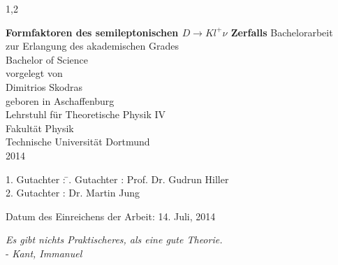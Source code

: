 \documentclass[11pt,a4paper,twoside]{report}
\begin{document}
\begin{spacing}{1,2}

%
%


\newcommand{\thetitle}{Formfaktoren des semileptonischen $D \rightarrow  K l^+ \nu$ Zerfalls}

\thispagestyle{empty}
\begin{center}
\Huge\textbf{\thetitle}
\vfill
\vfill
\Large
Bachelorarbeit \\ zur Erlangung des akademischen Grades \\ Bachelor of Science \\
\vspace{20pt}
\normalsize
vorgelegt von \\[5pt]
{\Large Dimitrios Skodras} \\[5pt]
geboren in Aschaffenburg \\
\vspace{20pt}
Lehrstuhl für Theoretische Physik IV \\ Fakultät Physik \\
Technische Universität Dortmund \\ 2014
\end{center}
\newpage


\thispagestyle{empty}
\vspace*{\fill}
\begin{tabbing}
1. Gutachter : \=. Gutachter : \>Prof. Dr. Gudrun Hiller \\[11pt]
2. Gutachter : \>Dr. Martin Jung\\[11pt]
\end{tabbing}
\vspace{11pt}
Datum des Einreichens der Arbeit: 14. Juli, 2014
\newpage
\thispagestyle{empty}
\begin{flushright} 
\textit{\glqq Es gibt nichts Praktischeres, als eine gute Theorie.\grqq}\\
- \textit{Kant, Immanuel}\\
\vspace{2cm}
\end{flushright}


\end{spacing}
\end{document}
